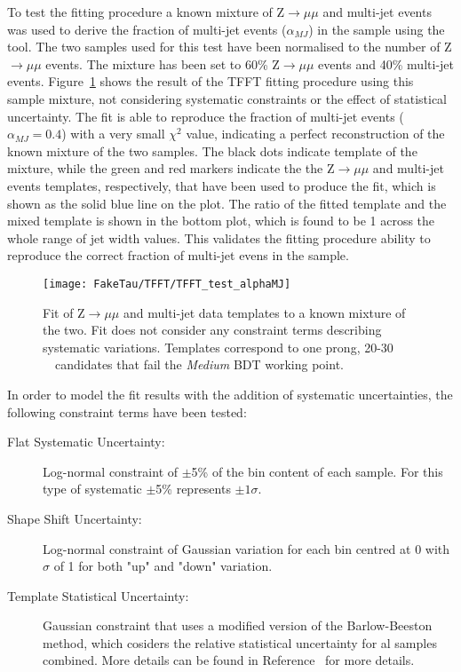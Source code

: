 	To test the fitting procedure a known mixture of Z$\rightarrow\mu\mu$ and multi-jet events was used to derive the fraction of multi-jet events ($\alpha_{MJ}$) in the sample using the tool.
	 The two samples used for this test have been normalised to the number of Z$\rightarrow\mu\mu$ events.
	 The mixture has been set to 60\% Z$\rightarrow\mu\mu$ events and 40\% multi-jet events. 
	Figure~\ref{fig:TFFT_test_alphaMJ} shows the result of the \ac{TFFT} fitting procedure using this sample mixture, not considering systematic constraints or the effect of statistical uncertainty. 
	The fit is able to reproduce the fraction of multi-jet events ($\alpha_{MJ}=0.4$) with a very small $\chi^2$ value, indicating a perfect reconstruction of the known mixture of the two samples. 
	The black dots indicate template of the mixture, while the green and red markers indicate the the Z$\rightarrow\mu\mu$ and multi-jet  events templates, respectively, that have been used to produce the fit, which is shown as the solid blue line on the plot. 
	The ratio of the fitted template and the mixed template is shown in the bottom plot, which is found to be 1 across the whole range of jet width values. 
	This validates the fitting procedure ability to reproduce the correct fraction of multi-jet evens in the sample. 
	\begin{figure}[!hbt]
	\centering
	\texttt{[image: FakeTau/TFFT/TFFT\_test\_alphaMJ]}
	\caption{Fit of Z$\rightarrow\mu\mu$ and multi-jet data templates to a known mixture of the two. Fit does not consider any constraint terms describing systematic variations. Templates correspond to one prong, 20-30 \gev\ \htau\ candidates that fail the \textit{Medium} \ac{BDT} working point.}
	\label{fig:TFFT_test_alphaMJ}
	\end{figure}
	
	In order to model the fit results with the addition of systematic uncertainties, the following constraint terms have been tested: 
	\begin{description}
	\item[Flat Systematic Uncertainty:] Log-normal constraint of $\pm$5\% of the bin content of each sample. For this type of systematic $\pm$5\% represents $\pm1\sigma$.
	\item[Shape Shift Uncertainty:] Log-normal constraint of Gaussian variation for each bin centred at 0 with $\sigma$ of 1 for both "up" and "down" variation.
	\item[Template Statistical Uncertainty:] Gaussian constraint that uses a modified version of the Barlow-Beeston method, which cosiders the relative statistical uncertainty for al samples combined. More details can be found in Reference~\cite{BARLOW1993219} for more details.
	\end{description}

